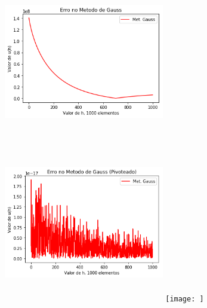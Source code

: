 \documentclass{article}
\begin{document}
\begin{figure}[!htb]
\includegraphics[width=7cm,height=7cm]{EGauss1000part.png}
\includegraphics [width=7cm,height=7cm]{EGaussP1000part.png}
\texttt{[image: ]}
\end{figure}
\end{document}
